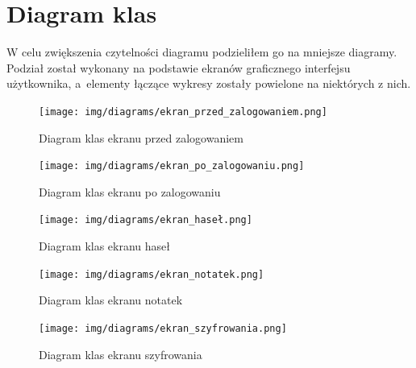 \documentclass[a4paper]{article}
\begin{document}
\section{Diagram klas}
W celu zwiększenia czytelności diagramu podzieliłem go na mniejsze diagramy. Podział został wykonany na podstawie ekranów graficznego interfejsu użytkownika, a~elementy łączące wykresy zostały powielone na niektórych z nich.
\begin{figure}[H]
    \centering
    \texttt{[image: img/diagrams/ekran\_przed\_zalogowaniem.png]}
    \caption{Diagram klas ekranu przed zalogowaniem}
    \label{fig:diagramPrzedL}
\end{figure}
\begin{figure}[H]
    \centering
    \texttt{[image: img/diagrams/ekran\_po\_zalogowaniu.png]}
    \caption{Diagram klas ekranu po zalogowaniu}
    \label{fig:diagramPoL}
\end{figure}
\begin{figure}[H]
    \centering
    \texttt{[image: img/diagrams/ekran\_haseł.png]}
    \caption{Diagram klas ekranu haseł}
    \label{fig:diagramH}
\end{figure}
\begin{figure}[H]
    \centering
    \texttt{[image: img/diagrams/ekran\_notatek.png]}
    \caption{Diagram klas ekranu notatek}
    \label{fig:diagramN}
\end{figure}
\begin{figure}[H]
    \centering
    \texttt{[image: img/diagrams/ekran\_szyfrowania.png]}
    \caption{Diagram klas ekranu szyfrowania}
    \label{fig:diagramSz}
\end{figure}
\label{end}
\end{document}

